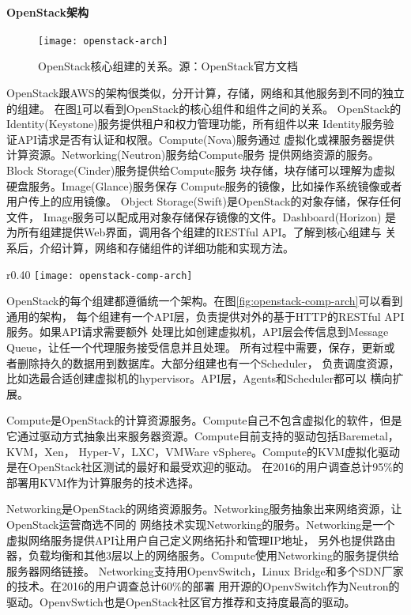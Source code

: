 \paragraph{OpenStack架构}
\begin{figure}
  \centering
    \texttt{[image: openstack-arch]}
    \caption{OpenStack核心组建的关系。源：OpenStack官方文档}
  \label{fig:openstack-arch}
\end{figure}
OpenStack跟AWS的架构很类似，分开计算，存储，网络和其他服务到不同的独立的组建。
在图\ref{fig:openstack-arch}可以看到OpenStack的核心组件和组件之间的关系。
OpenStack的Identity(Keystone)服务提供租户和权力管理功能，所有组件以来
Identity服务验证API请求是否有认证和权限。Compute(Nova)服务通过
虚拟化或裸服务器提供计算资源。Networking(Neutron)服务给Compute服务
提供网络资源的服务。Block Storage(Cinder)服务提供给Compute服务
块存储，块存储可以理解为虚拟硬盘服务。Image(Glance)服务保存
Compute服务的镜像，比如操作系统镜像或者用户传上的应用镜像。
Object Storage(Swift)是OpenStack的对象存储，保存任何文件，
Image服务可以配成用对象存储保存镜像的文件。Dashboard(Horizon)
是为所有组建提供Web界面，调用各个组建的RESTful API。了解到核心组建与
关系后，介绍计算，网络和存储组件的详细功能和实现方法。

\begin{wrapfigure}{r}{0.40\textwidth}
  \centering
    \texttt{[image: openstack-comp-arch]}
    \caption{OpenStack组建通用架构}
  \label{fig:openstack-comp-arch}
\end{wrapfigure}
OpenStack的每个组建都遵循统一个架构。在图\ref{fig:openstack-comp-arch}可以看到通用的架构，
每个组建有一个API层，负责提供对外的基于HTTP的RESTful API服务。如果API请求需要额外
处理比如创建虚拟机，API层会传信息到Message Queue，让任一个代理服务接受信息并且处理。
所有过程中需要，保存，更新或者删除持久的数据用到数据库。大部分组建也有一个Scheduler，
负责调度资源，比如选最合适创建虚拟机的hypervisor。API层，Agents和Scheduler都可以
横向扩展。

Compute是OpenStack的计算资源服务。Compute自己不包含虚拟化的软件，但是
它通过驱动方式抽象出来服务器资源。Compute目前支持的驱动包括Baremetal，KVM，Xen，
Hyper-V，LXC，VMWare vSphere。Compute的KVM虚拟化驱动是在OpenStack社区测试的最好和最受欢迎的驱动。
在2016的用户调查总计95\%的部署用KVM作为计算服务的技术选择。

Networking是OpenStack的网络资源服务。Networking服务抽象出来网络资源，让OpenStack运营商选不同的
网络技术实现Networking的服务。Networking是一个虚拟网络服务提供API让用户自己定义网络拓扑和管理IP地址，
另外也提供路由器，负载均衡和其他3层以上的网络服务。Compute使用Networking的服务提供给服务器网络链接。
Networking支持用OpenvSwitch，Linux Bridge和多个SDN厂家的技术。在2016的用户调查总计60\%的部署
用开源的OpenvSwitch作为Neutron的驱动。OpenvSwtich也是OpenStack社区官方推荐和支持度最高的驱动。

